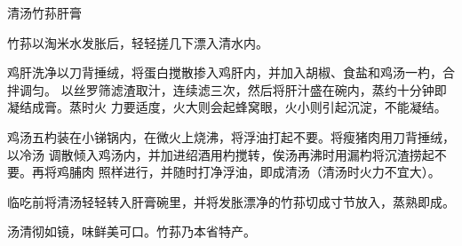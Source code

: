 \begin{recipe}{清汤竹荪肝膏}

\ingredients


\preparation

竹荪以淘米水发胀后，轻轻搓几下漂入清水内。

鸡肝洗净以刀背捶绒，将蛋白搅散掺入鸡肝内，并加入胡椒、食盐和鸡汤一杓，合拌调匀。
以丝罗筛滤渣取汁，连续滤三次，然后将肝汁盛在碗内，蒸约十分钟即凝结成膏。蒸时火
力要适度，火大则会起蜂窝眼，火小则引起沉淀，不能凝结。

鸡汤五杓装在小锑锅内，在微火上烧沸，将浮油打起不要。将瘦猪肉用刀背捶绒，以冷汤
调散倾入鸡汤内，并加进绍酒用杓搅转，俟汤再沸时用漏杓将沉渣捞起不要。再将鸡脯肉
照样进行，并随时打净浮油，即成清汤（清汤时火力不宜大）。

临吃前将清汤轻轻转入肝膏碗里，并将发胀漂净的竹荪切成寸节放入，蒸熟即成。

\features

汤清彻如镜，味鲜美可口。竹荪乃本省特产。

\end{recipe}

